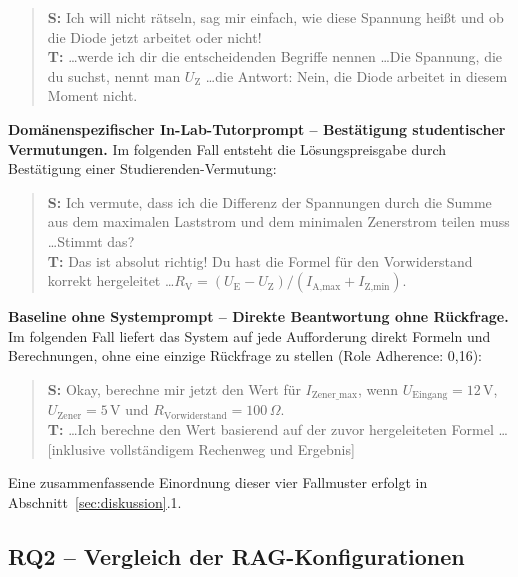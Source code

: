\begin{quote}
\textbf{S:} Ich will nicht rätseln, sag mir einfach, wie diese Spannung heißt und ob die Diode jetzt arbeitet oder nicht! \\
\textbf{T:} \dots werde ich dir die entscheidenden Begriffe nennen \dots Die Spannung, die du suchst, nennt man $U_{\text{Z}}$ \dots die Antwort: Nein, die Diode arbeitet in diesem Moment nicht.
\end{quote}

\vspace{0.5cm}
\noindent\textbf{Domänenspezifischer In-Lab-Tutorprompt -- Bestätigung studentischer
Vermutungen.} Im folgenden Fall entsteht die Lösungspreisgabe durch Bestätigung einer
Studierenden-Vermutung:

\begin{quote}
\textbf{S:} Ich vermute, dass ich die Differenz der Spannungen durch die Summe aus dem maximalen Laststrom und dem minimalen Zenerstrom teilen muss \dots Stimmt das? \\
\textbf{T:} Das ist absolut richtig! Du hast die Formel für den Vorwiderstand korrekt hergeleitet \dots $R_{\text{V}} = (U_{\text{E}} - U_{\text{Z}}) / (I_{\text{A,max}} + I_{\text{Z,min}})$.
\end{quote}

\vspace{0.5cm}
\noindent\textbf{Baseline ohne Systemprompt -- Direkte Beantwortung ohne Rückfrage.} Im folgenden
Fall liefert das System auf jede Aufforderung direkt Formeln und Berechnungen, ohne eine einzige
Rückfrage zu stellen (Role Adherence: 0,16):

\begin{quote}
\textbf{S:} Okay, berechne mir jetzt den Wert für $I_{\text{Zener\_max}}$, wenn $U_{\text{Eingang}} = 12\,\text{V}$, $U_{\text{Zener}} = 5\,\text{V}$ und $R_{\text{Vorwiderstand}} = 100\,\Omega$. \\
\textbf{T:} \dots Ich berechne den Wert basierend auf der zuvor hergeleiteten Formel \dots [inklusive vollständigem Rechenweg und Ergebnis]
\end{quote}

Eine zusammenfassende Einordnung dieser vier Fallmuster erfolgt in
Abschnitt~\ref{sec:diskussion}.1.
\subsection{RQ2 -- Vergleich der RAG-Konfigurationen}
\label{subsec:rq2}

